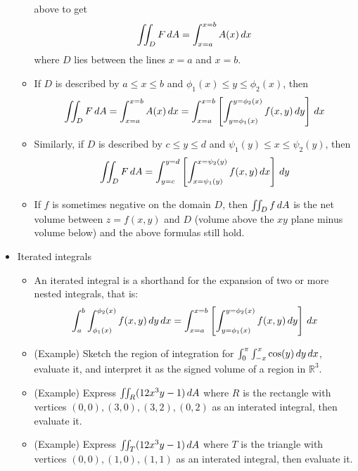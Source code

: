 \documentclass[11pt]{article}
\begin{document}
\begin{itemize}
\begin{itemize}
      above to get
        \[
          \iint_D F\,d A
            =
          \int_{x=a}^{x=b}
          A(x)
          \,d x
        \]
      where \(D\) lies between the lines \(x=a\) and \(x=b\).
      \item If \(D\) is described by \(a\leq x\leq b\) and
        \(\phi_1(x)\leq y\leq \phi_2(x)\), then
        \[
          \iint_D F\,d A
            =
          \int_{x=a}^{x=b}
          A(x)
          \,d x
            =
          \int_{x=a}^{x=b}
          \left[
          \int_{y=\phi_1(x)}^{y=\phi_2(x)}
          f(x,y) \,d y
          \right] \,d x
        \]
      \item Similarly, if \(D\) is described by \(c\leq y\leq d\) and
        \(\psi_1(y)\leq x\leq \psi_2(y)\), then
        \[
          \iint_D F\,d A
            =
          \int_{y=c}^{y=d}
          \left[
          \int_{x=\psi_1(y)}^{x=\psi_2(y)}
          f(x,y) \,d x
          \right] \,d y
        \]
      \item If \(f\) is sometimes negative on the domain \(D\), then
        \(\iint_D f\,d A\) is the net volume between \(z=f(x,y)\)
        and \(D\) (volume above the
        \(xy\) plane minus volume below) and the above formulas still hold.
    \end{itemize}
  \item Iterated integrals
    \begin{itemize}
      \item An iterated integral is a shorthand for the expansion of two
        or more nested integrals, that is:
        \[
          \int_a^b
          \int_{\phi_1(x)}^{\phi_2(x)}
          f(x,y)
          \,d y\,d x
            =
          \int_{x=a}^{x=b}
          \left[
          \int_{y=\phi_1(x)}^{y=\phi_2(x)}
          f(x,y) \,d y
          \right] \,d x
        \]
      \item (Example) Sketch the region of integration for
            \(\int_0^\pi\int_{-x}^x \cos(y)\,d y\,d x\),
            evaluate it,
            and interpret it as the signed volume of a region in \(\mathbb R^3\).
      \item (Example) Express \(\iint_R (12x^3y-1)\,d A\) where
            \(R\) is the
            rectangle with vertices \((0,0),(3,0),(3,2),(0,2)\)
            as an interated integral, then evaluate it.
      \item (Example) Express \(\iint_T (12x^3y-1)\,d A\) where
            \(T\) is the
            triangle with vertices \((0,0),(1,0),(1,1)\)
            as an interated integral, then evaluate it.

\end{itemize}
\end{itemize}
\end{document}

